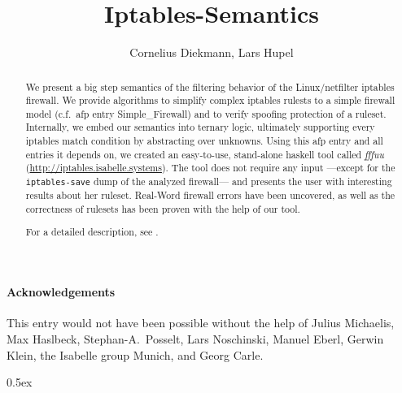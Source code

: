 \documentclass[11pt,a4paper]{article}
\begin{document}
\title{Iptables-Semantics}
\author{Cornelius Diekmann, Lars Hupel}
\maketitle

\begin{abstract}  
  We present a big step semantics of the filtering behavior of the Linux/netfilter iptables firewall. 
  We provide algorithms to simplify complex iptables rulests to a simple firewall model (c.f.\ afp entry Simple\_Firewall) and to verify spoofing protection of a ruleset. 
  Internally, we embed our semantics into ternary logic, ultimately supporting every iptables match condition by abstracting over unknowns. 
  Using this afp entry and all entries it depends on, we created an easy-to-use, stand-alone haskell tool called \emph{fffuu} (\url{http://iptables.isabelle.systems}). 
  The tool does not require any input ---except for the \texttt{iptables-save} dump of the analyzed firewall--- and presents the user with interesting results about her ruleset. 
  Real-Word firewall errors have been uncovered, as well as the correctness of rulesets has been proven with the help of our tool. 
  
For a detailed description, see \cite{diekmann2015fm,diekmann2015cnsm,diekmann2016networking,diekmann2015congress}. 
\end{abstract}

\paragraph*{Acknowledgements}
This entry would not have been possible without the help of Julius Michaelis, Max Haslbeck, Stephan-A.\ Posselt, Lars Noschinski, Manuel Eberl, Gerwin Klein, the Isabelle group Munich, and Georg Carle.
\bigskip

\tableofcontents

\parindent 0pt\parskip 0.5ex





\end{document}
